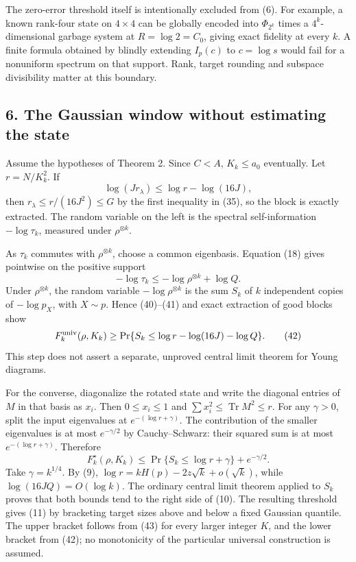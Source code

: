 \documentclass[11pt]{article}
\begin{document}
The zero-error threshold itself is intentionally excluded from (6). For example, a known rank-four state on \(4\times4\) can be globally encoded into \(\Phi_{2^k}\) times a \(4^k\)-dimensional garbage system at \(R=\log2=C_0\), giving exact fidelity at every \(k\). A finite formula obtained by blindly extending \(I_p(c)\) to \(c=\log s\) would fail for a nonuniform spectrum on that support. Rank, target rounding and subspace divisibility matter at this boundary.

\hypertarget{the-gaussian-window-without-estimating-the-state}{%
\subsection{6. The Gaussian window without estimating the state}\label{the-gaussian-window-without-estimating-the-state}}

Assume the hypotheses of Theorem 2. Since \(C<A\), \(K_k\le a_0\) eventually. Let \(r=N/K_k^2\). If \[
 \log(Jr_\lambda)\le\log r-\log(16J),
 \tag{40}
\] then \(r_\lambda\le r/(16J^2)\le G\) by the first inequality in (35), so the block is exactly extracted. The random variable on the left is the spectral self-information \(-\log\tau_k\), measured under \(\rho^{\otimes k}\).

As \(\tau_k\) commutes with \(\rho^{\otimes k}\), choose a common eigenbasis. Equation (18) gives pointwise on the positive support \[
 -\log\tau_k\le-\log\rho^{\otimes k}+\log Q.
 \tag{41}
\] Under \(\rho^{\otimes k}\), the random variable \(-\log\rho^{\otimes k}\) is the sum \(S_k\) of \(k\) independent copies of \(-\log p_X\), with \(X\sim p\). Hence (40)--(41) and exact extraction of good blocks show \[
 F_k^{\rm univ}(\rho,K_k)\ge
 \Pr\{S_k\le\log r-\log(16J)-\log Q\}.
 \tag{42}
\] This step does not assert a separate, unproved central limit theorem for Young diagrams.

For the converse, diagonalize the rotated state and write the diagonal entries of \(M\) in that basis as \(x_i\). Then \(0\le x_i\le1\) and \(\sum x_i^2\le\operatorname{Tr}M^2\le r\). For any \(\gamma>0\), split the input eigenvalues at \(e^{-(\log r+\gamma)}\). The contribution of the smaller eigenvalues is at most \(e^{-\gamma/2}\) by Cauchy--Schwarz: their squared sum is at most \(e^{-(\log r+\gamma)}\). Therefore \[
 F_k^\star(\rho,K_k)\le
 \Pr\{S_k\le\log r+\gamma\}+e^{-\gamma/2}.
 \tag{43}
\] Take \(\gamma=k^{1/4}\). By (9), \(\log r=kH(p)-2z\sqrt{k}+o(\sqrt{k})\), while \(\log(16JQ)=O(\log k)\). The ordinary central limit theorem applied to \(S_k\) proves that both bounds tend to the right side of (10). The resulting threshold gives (11) by bracketing target sizes above and below a fixed Gaussian quantile. The upper bracket follows from (43) for every larger integer \(K\), and the lower bracket from (42); no monotonicity of the particular universal construction is assumed.
\end{document}
